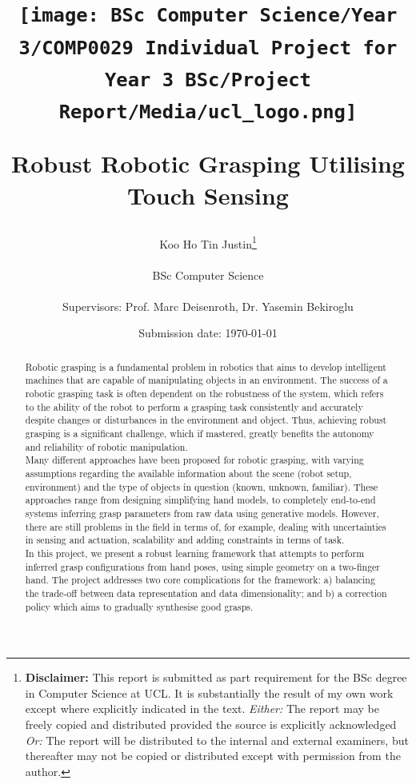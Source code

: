 \documentclass[12pt, a4paper]{report}
\title{{\vspace{-2in}\texttt{[image: BSc Computer Science/Year 3/COMP0029 Individual Project for Year 3 BSc/Project Report/Media/ucl\_logo.png]}}\\
\vspace{2cm}
\begin{adjustwidth}{1cm}{1cm}
    \centering
    \Huge Robust Robotic Grasping Utilising Touch Sensing
\end{adjustwidth}}
\date{Submission date: \today}
\author{Koo Ho Tin Justin\thanks{
{\bf Disclaimer:}
This report is submitted as part requirement for the BSc degree in Computer Science at UCL. It is
substantially the result of my own work except where explicitly indicated in the text.
\emph{Either:} The report may be freely copied and distributed provided the source is explicitly acknowledged
\newline  %
\emph{Or:}\newline
The report will be distributed to the internal and external examiners, but thereafter may not be copied or distributed except with permission from the author.}
\\ \\
BSc Computer Science\\ \\
Supervisors: Prof. Marc Deisenroth, Dr. Yasemin Bekiroglu}
\theoremstyle{definition}
\begin{document}
\onehalfspacing
\maketitle


\begin{abstract}
Robotic grasping is a fundamental problem in robotics that aims to develop intelligent machines that are capable of manipulating objects in an environment. The success of a robotic grasping task is often dependent on the robustness of the system, which refers to the ability of the robot to perform a grasping task consistently and accurately despite changes or disturbances in the environment and object. Thus, achieving robust grasping is a significant challenge, which if mastered, greatly benefits the autonomy and reliability of robotic manipulation.\\

Many different approaches have been proposed for robotic grasping, with varying assumptions regarding the available information about the scene (robot setup, environment) and the type of objects in question (known, unknown, familiar). These approaches range from designing simplifying hand models, to completely end-to-end systems inferring grasp parameters from raw data using generative models. However, there are still problems in the field in terms of, for example, dealing with uncertainties in sensing and actuation, scalability and adding constraints in terms of task.\\

In this project, we present a robust learning framework that attempts to perform inferred grasp configurations from hand poses, using simple geometry on a two-finger hand. The project addresses two core complications for the framework: a) balancing the trade-off between data representation and data dimensionality; and b) a correction policy which aims to gradually synthesise good grasps.
\end{abstract}


\renewcommand\abstractname{Acknowledgments}
\begin{abstract}
    
\end{abstract}
\end{document}
